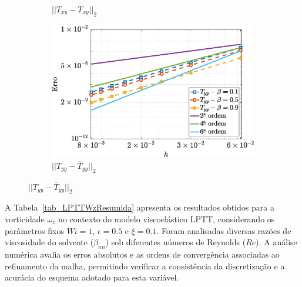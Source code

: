 \begin{figure}[H]
\begin{subfigure}[b]{.47\textwidth}
        \caption{$||T_{xy} - \overline{T}_{xy}||_{2}$}
        \label{error_txy_2nd_Case1_LPTT_eps_05}
    \end{subfigure}
    \qquad
    \begin{subfigure}[b]{.47\textwidth}
        \includegraphics[width=\textwidth]{figures/Case12/LPTT/Errors/NormErr_2nd_Re_100_Wi_1_epsilon_0.5_xi_0.1_alphaG_0_Dt_1e-06_at_0.05_tipsim_1_MMS_12_Tyy.eps}
        \caption{$||T_{yy} - \overline{T}_{yy}||_{2}$}
        \label{error_tyy_2nd_Case1_LPTT_eps_05}
    \end{subfigure}
    \fautor
\end{figure}

A Tabela~\ref{tab_LPTTWzResumida} apresenta os resultados obtidos para a vorticidade $\omega_z$ no contexto do modelo viscoelástico LPTT, considerando os parâmetros fixos $Wi = 1$, $\epsilon = 0.5$ e $\xi = 0.1$. Foram analisadas diversas razões de viscosidade do solvente ($\beta_{nn}$) sob diferentes números de Reynolds ($Re$). A análise numérica avalia os erros absolutos e as ordens de convergência associadas ao refinamento da malha, permitindo verificar a consistência da discretização e a acurácia do esquema adotado para esta variável.

